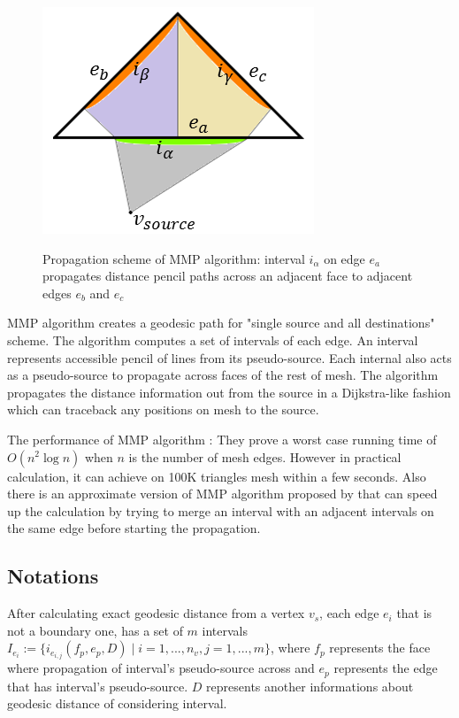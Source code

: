 \documentclass[a4paper,twoside]{article}
\begin{document}
\begin{figure}[!h]
	\centering
	{\includegraphics[width=0.75\columnwidth]{images/mmp_algorithm.png}}
	\caption{Propagation scheme of MMP algorithm: interval $i_{\alpha}$ on edge $e_a$ propagates distance pencil paths across an adjacent face to adjacent edges $e_b$ and $e_c$ }
	\label{fig:mmp algorithm}
\end{figure}

MMP algorithm creates a geodesic path for "single source and all destinations" scheme. The algorithm computes a set of intervals of each edge. An interval represents accessible pencil of lines from its pseudo-source. Each internal also acts as a pseudo-source to propagate across faces of the rest of mesh. The algorithm propagates the distance information out from the source in a Dijkstra-like fashion which can traceback any positions on mesh to the source.

The performance of MMP algorithm : They prove a worst case
running time of $O(n^2 \log n)$ when $n$ is the number of mesh edges. However in practical calculation, it can achieve on 100K triangles mesh within a few seconds. Also there is an approximate version of MMP algorithm proposed by \cite{Surazhsky:2005:FEA:1073204.1073228} that can speed up the calculation by trying to merge an interval with an adjacent intervals on the same edge before starting the propagation.

\subsection*{Notations}
After calculating exact geodesic distance from a vertex $v_s$, each edge $e_i$ that is not a boundary one, has a set of $m$ intervals $I_{e_i}:=\{ i_{e_{i,j}}(f_p,e_p,D) \mid i = 1, ... ,n_v , j = 1,...,m\}$, where $f_p$ represents the face where propagation of interval's pseudo-source across and $e_p$ represents the edge that has interval's pseudo-source. $D$ represents another informations about geodesic distance of considering interval.
\end{document}
